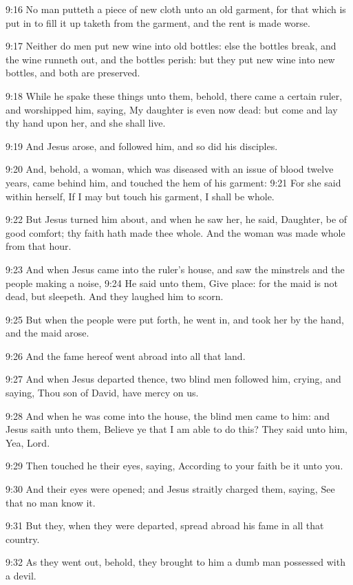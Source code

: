 9:16 No man putteth a piece of new cloth unto an old garment, for that
which is put in to fill it up taketh from the garment, and the rent is
made worse.

9:17 Neither do men put new wine into old bottles: else the bottles
break, and the wine runneth out, and the bottles perish: but they put
new wine into new bottles, and both are preserved.

9:18 While he spake these things unto them, behold, there came a
certain ruler, and worshipped him, saying, My daughter is even now
dead: but come and lay thy hand upon her, and she shall live.

9:19 And Jesus arose, and followed him, and so did his disciples.

9:20 And, behold, a woman, which was diseased with an issue of blood
twelve years, came behind him, and touched the hem of his garment:
9:21 For she said within herself, If I may but touch his garment, I
shall be whole.

9:22 But Jesus turned him about, and when he saw her, he said,
Daughter, be of good comfort; thy faith hath made thee whole. And the
woman was made whole from that hour.

9:23 And when Jesus came into the ruler's house, and saw the minstrels
and the people making a noise, 9:24 He said unto them, Give place: for
the maid is not dead, but sleepeth. And they laughed him to scorn.

9:25 But when the people were put forth, he went in, and took her by
the hand, and the maid arose.

9:26 And the fame hereof went abroad into all that land.

9:27 And when Jesus departed thence, two blind men followed him,
crying, and saying, Thou son of David, have mercy on us.

9:28 And when he was come into the house, the blind men came to him:
and Jesus saith unto them, Believe ye that I am able to do this? They
said unto him, Yea, Lord.

9:29 Then touched he their eyes, saying, According to your faith be it
unto you.

9:30 And their eyes were opened; and Jesus straitly charged them,
saying, See that no man know it.

9:31 But they, when they were departed, spread abroad his fame in all
that country.

9:32 As they went out, behold, they brought to him a dumb man
possessed with a devil.

